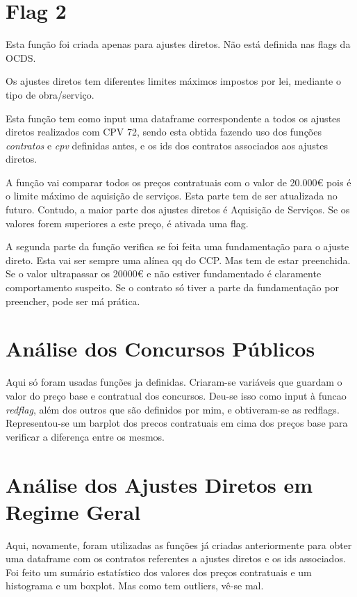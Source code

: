 \section{Flag 2}

Esta função foi criada apenas para ajustes diretos. Não está definida nas flags da OCDS. 

Os ajustes diretos tem diferentes limites máximos impostos por lei, mediante o tipo de obra/serviço. 

Esta função tem como input uma dataframe correspondente a todos os ajustes diretos realizados com CPV 72, sendo esta obtida fazendo uso dos funções \textit{contratos} e \textit{cpv} definidas antes, e os ids dos contratos associados aos ajustes diretos. 

A função vai comparar todos os preços contratuais com o valor de 20.000€ pois é o limite máximo de aquisição de serviços. Esta parte tem de  ser atualizada no futuro. Contudo, a maior parte dos ajustes diretos é Aquisição de Serviços. Se os valores forem superiores a este preço, é ativada uma flag.

A segunda parte da função verifica se foi feita uma fundamentação para o ajuste direto. Esta vai ser sempre uma alínea qq do CCP. Mas tem de estar preenchida. Se o valor ultrapassar os 20000€ e não estiver fundamentado é claramente comportamento suspeito. Se o contrato só tiver a parte da fundamentação por preencher, pode ser má prática. 


\section{Análise dos Concursos Públicos}

Aqui só foram usadas funções ja definidas. Criaram-se variáveis que guardam o valor do preço base e contratual dos concursos. Deu-se isso como input à funcao \textit{redflag}, além dos outros que são definidos por mim, e obtiveram-se as redflags. Representou-se um barplot dos precos contratuais em cima dos preços base para verificar a diferença entre os mesmos. 


\section{Análise dos Ajustes Diretos em Regime Geral}

Aqui, novamente, foram utilizadas as funções já criadas anteriormente para obter uma dataframe com os contratos referentes a ajustes diretos e os ids associados. Foi feito um sumário estatístico dos valores dos preços contratuais e um histograma e um boxplot. Mas como tem outliers, vê-se mal. 

